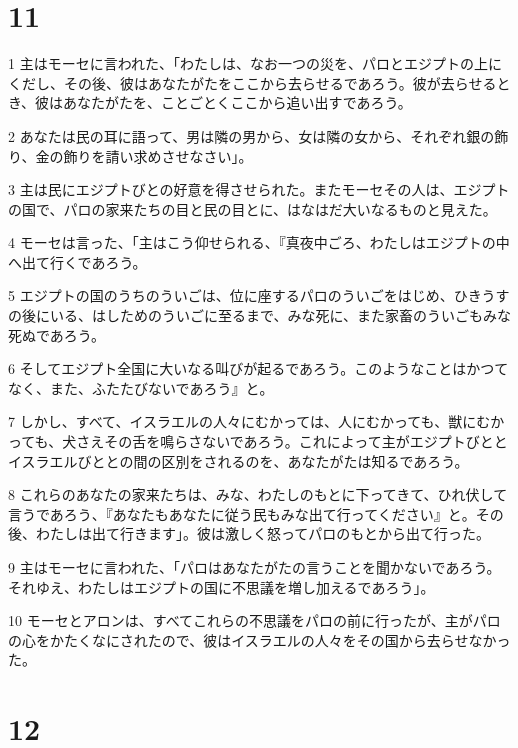 \chapter{11}

\par 1 主はモーセに言われた、「わたしは、なお一つの災を、パロとエジプトの上にくだし、その後、彼はあなたがたをここから去らせるであろう。彼が去らせるとき、彼はあなたがたを、ことごとくここから追い出すであろう。
\par 2 あなたは民の耳に語って、男は隣の男から、女は隣の女から、それぞれ銀の飾り、金の飾りを請い求めさせなさい」。
\par 3 主は民にエジプトびとの好意を得させられた。またモーセその人は、エジプトの国で、パロの家来たちの目と民の目とに、はなはだ大いなるものと見えた。
\par 4 モーセは言った、「主はこう仰せられる、『真夜中ごろ、わたしはエジプトの中へ出て行くであろう。
\par 5 エジプトの国のうちのういごは、位に座するパロのういごをはじめ、ひきうすの後にいる、はしためのういごに至るまで、みな死に、また家畜のういごもみな死ぬであろう。
\par 6 そしてエジプト全国に大いなる叫びが起るであろう。このようなことはかつてなく、また、ふたたびないであろう』と。
\par 7 しかし、すべて、イスラエルの人々にむかっては、人にむかっても、獣にむかっても、犬さえその舌を鳴らさないであろう。これによって主がエジプトびととイスラエルびととの間の区別をされるのを、あなたがたは知るであろう。
\par 8 これらのあなたの家来たちは、みな、わたしのもとに下ってきて、ひれ伏して言うであろう、『あなたもあなたに従う民もみな出て行ってください』と。その後、わたしは出て行きます」。彼は激しく怒ってパロのもとから出て行った。
\par 9 主はモーセに言われた、「パロはあなたがたの言うことを聞かないであろう。それゆえ、わたしはエジプトの国に不思議を増し加えるであろう」。
\par 10 モーセとアロンは、すべてこれらの不思議をパロの前に行ったが、主がパロの心をかたくなにされたので、彼はイスラエルの人々をその国から去らせなかった。

\chapter{12}


